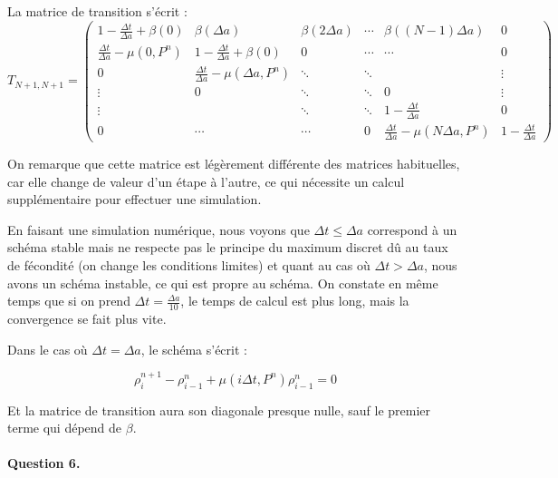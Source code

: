 \documentclass[paper=a4, french]{scrartcl} %
\numberwithin{equation}{section} %
\numberwithin{figure}{section} %
\numberwithin{table}{section} %
\begin{document}
La matrice de transition s\rq{}écrit :
\begin{equation}
T_{N+1,N+1} =
\begin{pmatrix}
1-\frac{\Delta t}{\Delta a}+\beta(0) & \beta(\Delta a) & \beta(2\Delta a) & \cdots & \beta((N-1)\Delta a) & 0 \\
\frac{\Delta t}{\Delta a} - \mu(0, P^n) & 1-\frac{\Delta t}{\Delta a}+\beta(0) & 0 & \cdots & \cdots & 0\\
0  & \frac{\Delta t}{\Delta a} - \mu(\Delta a, P^n)  & \ddots & \ddots  & & \vdots\\
\vdots & 0 & \ddots & \ddots&0&\vdots\\
\vdots & & \ddots  & \ddots&1-\frac{\Delta t}{\Delta a}&0\\
0 & \cdots & \cdots & 0 & \frac{\Delta t}{\Delta a} - \mu(N\Delta a, P^n) & 1-\frac{\Delta t}{\Delta a}
\end{pmatrix}
\end{equation}

On remarque que cette matrice est légèrement différente des matrices habituelles, car elle change de valeur d\rq{}un étape à l\rq{}autre, ce qui nécessite un calcul supplémentaire pour effectuer une simulation.

En faisant une simulation numérique, nous voyons que $\Delta t \leq \Delta a$ correspond à un schéma stable mais ne respecte pas le principe du maximum discret dû au taux de fécondité (on change les conditions limites) et quant au cas où $\Delta t > \Delta a$, nous avons un schéma instable, ce qui est propre au schéma. On constate en même temps que si on prend $\Delta t = \frac{\Delta a}{10}$, le temps de calcul est plus long, mais la convergence se fait plus vite.

Dans le cas où $\Delta t = \Delta a$, le schéma s\rq{}écrit : 

\begin{equation}
\rho_{i}^{n+1} - \rho_{i-1}^{n}+\mu(i\Delta t, P^n)\rho_{i-1}^{n} = 0
\end{equation}

Et la matrice de transition aura son diagonale presque nulle, sauf le premier terme qui dépend de $\beta$.


\paragraph{\textbf{Question 6.}}
~\\
\end{document}
